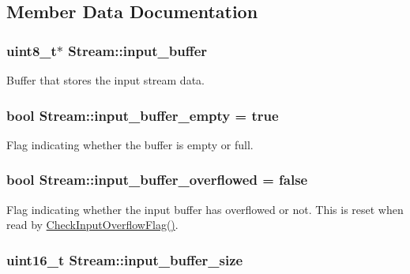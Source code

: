 \subsection{Member Data Documentation}
\hypertarget{class_stream_a81139fc126566f9d42470fdb405ed26a}{
\subsubsection[{input\-\_\-buffer}]{\setlength{\rightskip}{0pt plus 5cm}uint8\-\_\-t$\ast$ Stream\-::input\-\_\-buffer\hspace{0.3cm}{\ttfamily [protected]}}}\label{class_stream_a81139fc126566f9d42470fdb405ed26a}
Buffer that stores the input stream data. \hypertarget{class_stream_aff1c899af0d2dea35700d5665f378cd8}{
\subsubsection[{input\-\_\-buffer\-\_\-empty}]{\setlength{\rightskip}{0pt plus 5cm}bool Stream\-::input\-\_\-buffer\-\_\-empty = true\hspace{0.3cm}{\ttfamily [protected]}}}\label{class_stream_aff1c899af0d2dea35700d5665f378cd8}
Flag indicating whether the buffer is empty or full. \hypertarget{class_stream_ae7300cb8941cec142c14e8fc9baab9d3}{
\subsubsection[{input\-\_\-buffer\-\_\-overflowed}]{\setlength{\rightskip}{0pt plus 5cm}bool Stream\-::input\-\_\-buffer\-\_\-overflowed = false\hspace{0.3cm}{\ttfamily [protected]}}}\label{class_stream_ae7300cb8941cec142c14e8fc9baab9d3}
Flag indicating whether the input buffer has overflowed or not. This is reset when read by \hyperlink{class_stream_a088c4e68d568acfad715c56f408fe9f8}{Check\-Input\-Overflow\-Flag()}. \hypertarget{class_stream_a7373b1d6580a2d5dc74e788b3bb6a596}{
\subsubsection[{input\-\_\-buffer\-\_\-size}]{\setlength{\rightskip}{0pt plus 5cm}uint16\-\_\-t Stream\-::input\-\_\-buffer\-\_\-size\hspace{0.3cm}{\ttfamily [protected]}}}\label{class_stream_a7373b1d6580a2d5dc74e788b3bb6a596}
